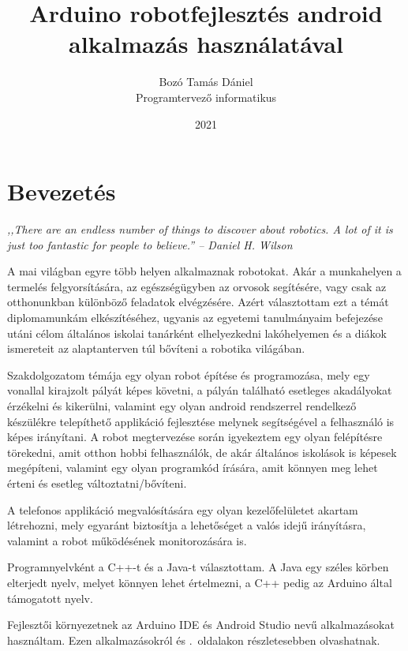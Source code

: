 \documentclass[]{thesis-ekf}
\theoremstyle{definition}
\begin{document}
\title{Arduino robotfejlesztés android alkalmazás használatával}
\author{Bozó Tamás Dániel\\Programtervező informatikus}
\date{2021}
\maketitle
\tableofcontents
\chapter*{Bevezetés}
\begin{flushright}
	\emph{,,There are an endless number of things to discover about robotics. A lot of it is just too fantastic for people to believe.'' -- Daniel H. Wilson}
\end{flushright}

A mai világban egyre több helyen alkalmaznak robotokat. Akár a munkahelyen a termelés felgyorsítására, az egészségügyben az orvosok segítésére, vagy csak az otthonunkban különböző feladatok elvégzésére. Azért választottam ezt a témát diplomamunkám elkészítéséhez, ugyanis az egyetemi tanulmányaim befejezése utáni célom általános iskolai tanárként elhelyezkedni lakóhelyemen és a diákok ismereteit az alaptanterven túl bővíteni a robotika világában.

Szakdolgozatom témája egy olyan robot építése és programozása, mely egy vonallal kirajzolt pályát képes követni, a pályán található esetleges akadályokat érzékelni és kikerülni, valamint egy olyan android rendszerrel rendelkező készülékre telepíthető applikáció fejlesztése melynek segítségével a felhasználó is képes irányítani. A robot megtervezése során igyekeztem egy olyan felépítésre törekedni, amit otthon hobbi felhasználók, de akár általános iskolások is képesek megépíteni, valamint egy olyan programkód írására, amit könnyen meg lehet érteni és esetleg változtatni/bővíteni.

A telefonos applikáció megvalósítására egy olyan kezelőfelületet akartam létrehozni, mely egyaránt biztosítja a lehetőséget a valós idejű irányításra, valamint a robot működésének monitorozására is.

Programnyelvként a C++-t és a Java-t választottam. A Java egy széles körben elterjedt nyelv, melyet könnyen lehet értelmezni, a C++ pedig az Arduino által támogatott nyelv.

Fejlesztői környezetnek az Arduino IDE és Android Studio nevű alkalmazásokat használtam. Ezen alkalmazásokról  és \az{\pageref{android-studio}}.~oldalakon részletesebben olvashatnak.
\end{document}
